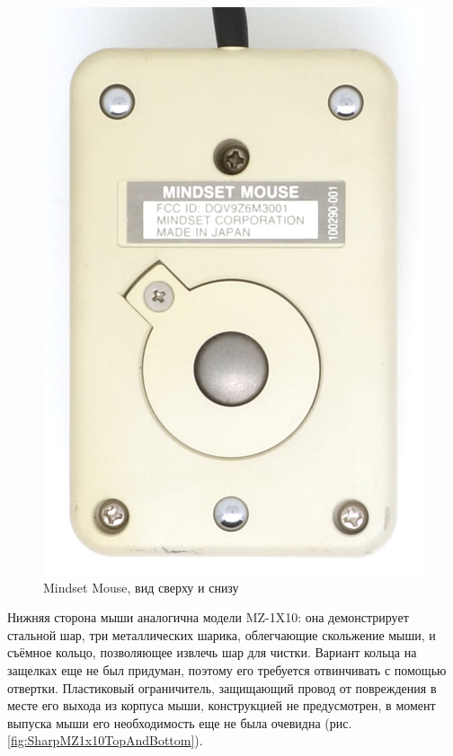 \documentclass[11pt, a4paper]{article}
\begin{document}
\begin{figure}[h]
    \includegraphics[scale=0.55]{1984_mindset_mouse/bottom_30.jpg}
    \caption{Mindset Mouse, вид сверху и снизу}
    \label{fig:MindsetMouseTopAndBottom}
\end{figure}

Нижняя сторона мыши аналогична модели MZ-1X10: она демонстрирует стальной шар, три металлических шарика, облегчающие скольжение мыши, и съёмное кольцо, позволяющее извлечь шар для чистки. Вариант кольца на защелках еще не был придуман, поэтому его требуется отвинчивать с помощью отвертки. Пластиковый ограничитель, защищающий провод от повреждения в месте его выхода из корпуса мыши, конструкцией не предусмотрен, в момент выпуска мыши его необходимость еще не была очевидна (рис. \ref{fig:SharpMZ1x10TopAndBottom}).
\end{document}
